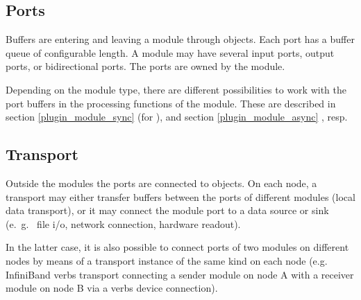       
\subsection{Ports}
Buffers are entering and leaving a module through 
  objects. 
Each port has a buffer queue of configurable length.
A module may have several input ports, output ports, 
or bidirectional ports. The ports are owned by the module.

Depending on the module type, there are different possibilities to
work with the port buffers in the processing functions of the module.
These are described in section \ref{plugin_module_sync} (for  ),
and section \ref{plugin_module_async}  , resp.
 
% 



\subsection{Transport}
Outside the modules the ports are connected to 
  objects.
On each node, a transport may either transfer buffers between 
the ports of different modules (local data transport), or it may connect the module port to a data 
source or sink (e.~g.~ file i/o, network connection, hardware readout).

In the latter case, it is also possible  to connect ports of two modules on 
different nodes by means of a transport instance of the same kind on 
each node (e.g. InfiniBand verbs transport connecting a sender module on node A with a receiver
module on node B via a verbs device connection).

